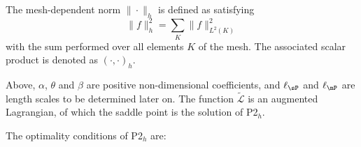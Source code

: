 
The mesh-dependent norm $\|\cdot\|_h$ is defined as satisfying
\begin{equation}
\|f\|_h^2 = \sum_K \|f\|^2_{L^2(K)} 
\end{equation}
with the sum performed over all elements $K$ of the mesh. The associated scalar product is denoted as $\left ( \cdot, \cdot \right )_h$.

Above, $\alpha$, $\theta$ and $\beta$ are positive non-dimensional coefficients, and $\ell_{\sP}$ and $\ell_{\mP}$ are length scales to be determined later on. The function $\tilde{\mathcal{L}}$ is an augmented Lagrangian, of which the saddle point is the solution of P2$_h$. 

The optimality conditions of P2$_h$ are:

